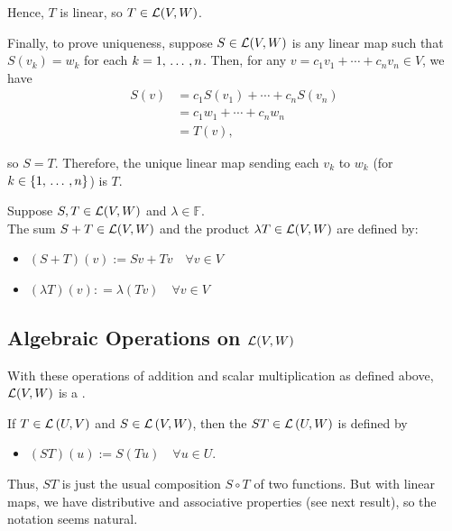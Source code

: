\begin{prf}
  Hence, $T$ is linear, so $T \in \mathcal{L}(V,W)$.

  Finally, to prove uniqueness, suppose \( S \in \mathcal{L}(V, W) \) is any linear map such that \( S(v_k) = w_k \) for each $k=1, {\, \ldots \,\,}, n$. Then, for any \( v = c_1 v_1 + \cdots + c_n v_n \in V \), we have
  \begin{align}
    S(v) &= c_1 S(v_1) + \cdots + c_n S(v_n) \\
         &= c_1 w_1 + \cdots + c_n w_n \\
         &= T(v),
  \end{align}

  so \( S = T \). Therefore, the unique linear map sending each $v_k$ to $w_k$ (for $k \in \{1, {\, \ldots \,\,}, n \}$) is $T$.
\end{prf}

\setcounter{thm}{4}
\begin{mydef} 
  Suppose $S, T \in {\mathcal{L}(V,W)}$ and $\lambda \in \mathbb{F}$. \\
  The sum $S+T \in \mathcal{L} (V,W)$ and the product $\lambda T \in \mathcal{L} (V,W)$ are defined by:
  \begin{itemize}
    \item $(S+T)(v) := Sv+Tv \quad \forall v \in V$
    \item $(\lambda T)(v) : = \lambda (Tv) \quad \forall v \in V$
  \end{itemize}
\end{mydef}

\subsection{Algebraic Operations on \texorpdfstring{$\mathcal{L}(V,W)$}{L(V,W)}}
\setcounter{thm}{5}
\begin{thm} [$\lvw$]
  With these operations of addition and scalar multiplication as defined above, $\lvw$ is a \vs.
\end{thm}

\setcounter{thm}{6}
\begin{mydef}
  If $T \in {\mathcal{L}\left (U, V\right )}$ and $S \in {\mathcal{L}\left (V, W\right )}$, then the  $ST \in {\mathcal{L}\left (U, W\right )}$ is defined by
  \begin{itemize}
    \item[] $(ST)(u) := S(Tu) \quad \forall u \in U$.
  \end{itemize}

  Thus, $ST$ is just the usual composition $S \circ T$ of two functions. But with linear maps, we have distributive and associative properties (see next result), so the notation seems natural.
\end{mydef}


